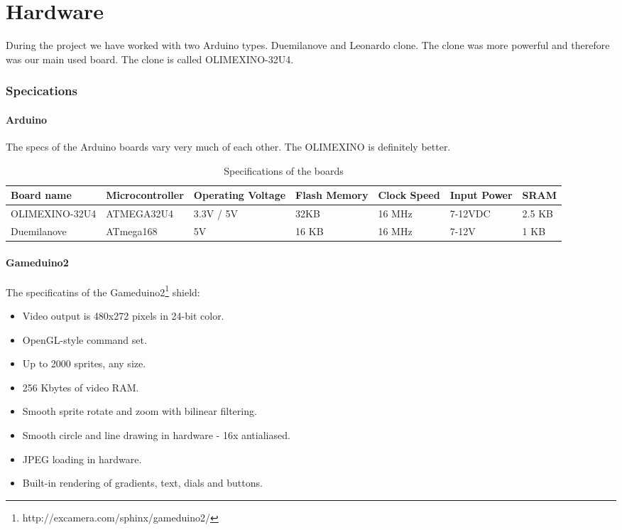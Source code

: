 \chapter{Hardware} %

During the project we have worked with two Arduino types. Duemilanove and Leonardo clone.
The clone was more powerful and therefore was our main used board. The clone is called
OLIMEXINO-32U4.
\subsection{Specications}

\subsubsection{Arduino}
The specs of the Arduino boards vary very much of each other. The OLIMEXINO is definitely
better.

\begin{table}[h]
\resizebox{16cm}{!} {
    \begin{tabular}{l|l|l|l|l|l|l}
    Board name     & Microcontroller & Operating Voltage & Flash Memory & Clock Speed & Input Power & SRAM   \\ \hline
    OLIMEXINO-32U4 & ATMEGA32U4      & 3.3V / 5V         & 32KB         & 16 MHz      & 7-12VDC     & 2.5 KB \\
    Duemilanove    & ATmega168       & 5V                & 16 KB        & 16 MHz      & 7-12V       & 1 KB   \\
    \end{tabular}
}
    \caption{Specifications of the boards}
\end{table}

\subsubsection{Gameduino2}
The specificatins of the Gameduino2\footnote{http://excamera.com/sphinx/gameduino2/} shield:

\begin{itemize}
  \footnotesize
  \item Video output is 480x272 pixels in 24-bit color.
  \item OpenGL-style command set.
  \item Up to 2000 sprites, any size.
  \item 256 Kbytes of video RAM.
  \item Smooth sprite rotate and zoom with bilinear filtering.
  \item Smooth circle and line drawing in hardware - 16x antialiased.
  \item JPEG loading in hardware.
  \item Built-in rendering of gradients, text, dials and buttons.
\end{itemize}


